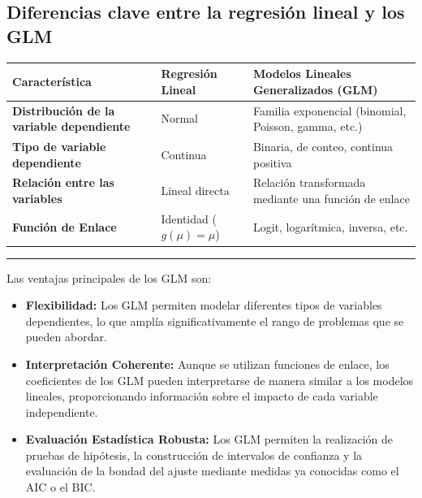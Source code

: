 \documentclass[
  letterpaper,
  DIV=11,
  numbers=noendperiod]{scrreprt}
\begin{document}
\subsection{Diferencias clave entre la regresión lineal y los
GLM}\label{diferencias-clave-entre-la-regresiuxf3n-lineal-y-los-glm}

\begin{longtable}[]{@{}
  >{\raggedright\arraybackslash}p{}
  >{\raggedright\arraybackslash}p{}
  >{\raggedright\arraybackslash}p{}@{}}
\toprule\noalign{}
\begin{minipage}[b]{\linewidth}\raggedright
\textbf{Característica}
\end{minipage} & \begin{minipage}[b]{\linewidth}\raggedright
\textbf{Regresión Lineal}
\end{minipage} & \begin{minipage}[b]{\linewidth}\raggedright
\textbf{Modelos Lineales Generalizados (GLM)}
\end{minipage} \\
\midrule\noalign{}
\endhead
\bottomrule\noalign{}
\endlastfoot
\textbf{Distribución de la variable dependiente} & Normal & Familia
exponencial (binomial, Poisson, gamma, etc.) \\
\textbf{Tipo de variable dependiente} & Continua & Binaria, de conteo,
continua positiva \\
\textbf{Relación entre las variables} & Lineal directa & Relación
transformada mediante una función de enlace \\
\textbf{Función de Enlace} & Identidad (\(g(\mu) = \mu\)) & Logit,
logarítmica, inversa, etc. \\
\end{longtable}

\begin{center}\rule{0.5\linewidth}{0.5pt}\end{center}

Las ventajas principales de los GLM son:

\begin{itemize}
\item
  \textbf{Flexibilidad:} Los GLM permiten modelar diferentes tipos de
  variables dependientes, lo que amplía significativamente el rango de
  problemas que se pueden abordar.
\item
  \textbf{Interpretación Coherente:} Aunque se utilizan funciones de
  enlace, los coeficientes de los GLM pueden interpretarse de manera
  similar a los modelos lineales, proporcionando información sobre el
  impacto de cada variable independiente.
\item
  \textbf{Evaluación Estadística Robusta:} Los GLM permiten la
  realización de pruebas de hipótesis, la construcción de intervalos de
  confianza y la evaluación de la bondad del ajuste mediante medidas ya
  conocidas como el AIC o el BIC.
\end{itemize}
\end{document}
